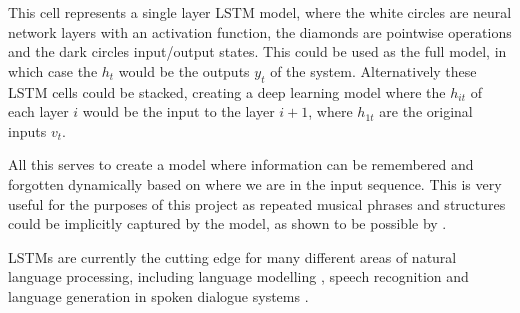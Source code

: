\documentclass[bsc,singlespacing,logo, parskip, deptreport]{infthesis}
\begin{document}
\begin{center}
\end{center}

This cell represents a single layer LSTM model, where the white circles are neural network layers with an activation function, the diamonds are pointwise operations and the dark circles input/output states. This could be used as the full model, in which case the $h_t$ would be the outputs $y_t$ of the system. Alternatively these LSTM cells could be stacked, creating a deep learning model where the $h_{it}$ of each layer $i$ would be the input to the layer $i+1$, where $h_{1t}$ are the original inputs $v_t$.

All this serves to create a model where information can be remembered and forgotten dynamically based on where we are in the input sequence. This is very useful for the purposes of this project as repeated musical phrases and structures could be implicitly captured by the model, as shown to be possible by \cite{eck2008learning}.

LSTMs are currently the cutting edge for many different areas of natural language processing, including language modelling \cite{sundermeyer2012lstm} \cite{pichotta2016using}, speech recognition \cite{han2017ese} and language generation in spoken dialogue systems \cite{wen2016multi}.
\end{document}
